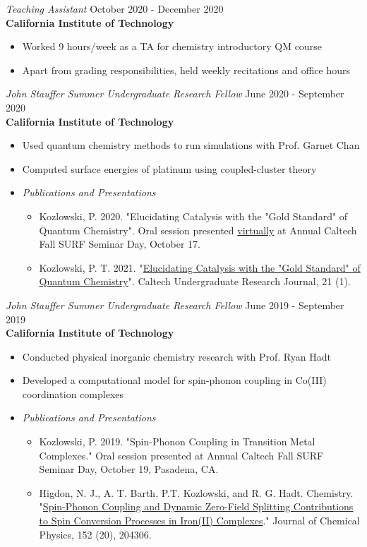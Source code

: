 \documentclass[margin,line]{resume}
\begin{document}
\begin{resume}
{\sl Teaching Assistant} \hfill October 2020 - December 2020\\
\textbf{California Institute of Technology}
\begin{itemize}
\item Worked 9 hours/week as a TA for chemistry introductory QM course
\item Apart from grading responsibilities, held weekly recitations and office hours
\end{itemize}
{\sl John Stauffer Summer Undergraduate Research Fellow} \hfill June 2020 - September 2020 \\
\textbf{California Institute of Technology}
\begin{itemize}
\item Used quantum chemistry methods to run simulations with Prof. Garnet Chan
\item Computed surface energies of platinum using coupled-cluster theory
\item \emph{Publications and Presentations}
    \begin{itemize}
        \item Kozlowski, P. 2020. "Elucidating Catalysis with the "Gold Standard" of Quantum Chemistry". Oral session presented \href{https://youtu.be/pcNnGM0bYRw}{virtually} at Annual Caltech Fall SURF Seminar Day, October 17.
        \item Kozlowski, P. T. 2021. "\href{https://curj.caltech.edu/2021/06/29/elucidating-catalysis-with-the-gold-standard-of-quantum-chemistry/}{Elucidating Catalysis with the "Gold Standard" of Quantum Chemistry}". Caltech Undergraduate Research Journal, 21 (1).
    \end{itemize}
\end{itemize} 
{\sl John Stauffer Summer Undergraduate Research Fellow} \hfill June 2019 - September 2019 \\
\textbf{California Institute of Technology}
\begin{itemize}
\item Conducted physical inorganic chemistry research with Prof. Ryan Hadt
\item Developed a computational model for spin-phonon coupling in Co(III)
coordination complexes
\item \emph{Publications and Presentations}
    \begin{itemize}
            \item Kozlowski, P. 2019. "Spin-Phonon Coupling in Transition Metal Complexes." Oral session presented at Annual Caltech Fall SURF Seminar Day, October 19, Pasadena, CA.
    \item Higdon, N. J., A. T. Barth, P.T. Kozlowski, and R. G. Hadt. Chemistry. "\href{https://doi.org/10.1063/5.0006361}{Spin-Phonon Coupling and Dynamic Zero-Field Splitting Contributions to Spin Conversion Processes in Iron(II) Complexes}." Journal of Chemical Physics, 152 (20), 204306.
    \end{itemize}
\end{itemize}

\end{resume}
\end{document}
